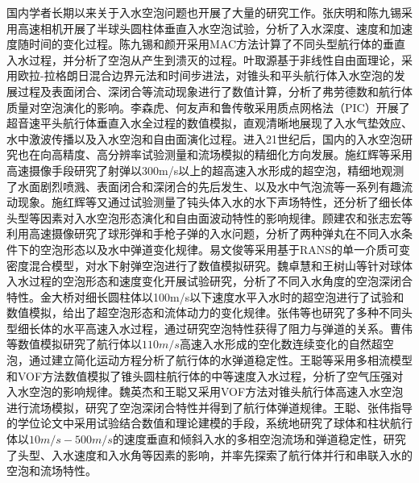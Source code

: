 国内学者长期以来关于入水空泡问题也开展了大量的研究工作。张庆明和陈九锡\cite{张庆明1984回转体垂直入水早期空泡的一个计算方法}采用高速相机开展了半球头圆柱体垂直入水空泡试验，分析了入水深度、速度和加速度随时间的变化过程。陈九锡和颜开\cite{陈九锡1986用}采用MAC方法计算了不同头型航行体的垂直入水过程，并分析了空泡从产生到溃灭的过程。叶取源\cite{叶取源1989锥头物体垂直入水空泡的发展和闭合, 叶取源1990用}基于非线性自由面理论，采用欧拉-拉格朗日混合边界元法和时间步进法，对锥头和平头航行体入水空泡的发展过程及表面闭合、深闭合等流动现象进行了数值计算，分析了弗劳德数和航行体质量对空泡演化的影响。李森虎、何友声和鲁传敬\cite{李森虎1992超声速平头物体垂直撞水的数值模拟}采用质点网格法（PIC）开展了超音速平头航行体垂直入水全过程的数值模拟，直观清晰地展现了入水气垫效应、水中激波传播以及入水空泡和自由面演化过程。进入21世纪后，国内的入水空泡研究也在向高精度、高分辨率试验测量和流场模拟的精细化方向发展。施红辉等\cite{shi2000optical}采用高速摄像手段研究了射弹以300m/s以上的超高速入水形成的超空泡，精细地观测了水面剧烈喷溅、表面闭合和深闭合的先后发生、以及水中气泡流等一系列有趣流动现象。施红辉等\cite{shi2001measurement, honghui2004underwater}又通过试验测量了钝头体入水的水下声场特性，还分析了细长体头型等因素对入水空泡形态演化和自由面波动特性的影响规律\cite{施红辉2012伴随超空泡产生的高速细长体入水实验研究}。顾建农和张志宏等利用高速摄像研究了球形弹和手枪子弹的入水问题，分析了两种弹丸在不同入水条件下的空泡形态以及水中弹道变化规律。易文俊等\cite{周家胜2007水下射弹的空泡形态特性研究}采用基于RANS的单一介质可变密度混合模型，对水下射弹空泡进行了数值模拟研究。魏卓慧和王树山等\cite{魏卓慧2010experimental}针对球体入水过程的空泡形态和速度变化开展试验研究，分析了不同入水角度的空泡深闭合特性。金大桥\cite{金大桥2010水下动能射弹空泡形态及流体动力特性研究}对细长圆柱体以100m/s以下速度水平入水时的超空泡进行了试验和数值模拟，给出了超空泡形态和流体动力的变化规律。张伟等\cite{张伟2011弹体高速入水特性实验研究, guo2012experimental, guo2012investigation}也研究了多种不同头型细长体的水平高速入水过程，通过研究空泡特性获得了阻力与弹道的关系。曹伟等\cite{曹伟2012自然超空泡航行体弹道稳定性分析}数值模拟研究了航行体以$110m/s$高速入水形成的空化数连续变化的自然超空泡，通过建立简化运动方程分析了航行体的水弹道稳定性。王聪等\cite{王聪2012空气压强对垂直入水空泡影响的数值研究}采用多相流模型和VOF方法数值模拟了锥头圆柱航行体的中等速度入水过程，分析了空气压强对入水空泡的影响规律。魏英杰和王聪\cite{马庆鹏2014锥头圆柱体高速入水空泡深闭合数值模拟研究}又采用VOF方法对锥头航行体高速入水空泡进行流场模拟，研究了空泡深闭合特性并得到了航行体弹道规律。王聪\cite{何春涛2012典型运动体入水过程多相流动特性研究}、张伟\cite{齐亚飞2016弹体高速入水弹道稳定及空泡特性研究}指导的学位论文中采用试验结合数值和理论建模的手段，系统地研究了球体和柱状航行体以$10m/s-500m/s$的速度垂直和倾斜入水的多相空泡流场和弹道稳定性，研究了头型、入水速度和入水角等因素的影响，并率先探索了航行体并行和串联入水的空泡和流场特性。
